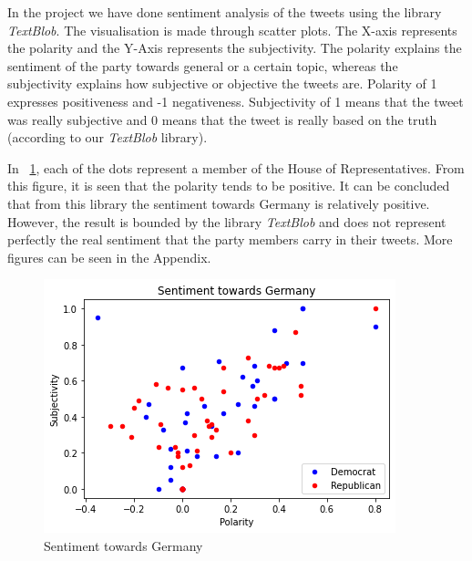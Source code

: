In the project we have done sentiment analysis of the tweets using the library \textit{TextBlob}. The visualisation is made through scatter plots. The X-axis represents the polarity and the Y-Axis represents the subjectivity. The polarity explains the sentiment of the party towards general or a certain topic, whereas the subjectivity explains how subjective or objective the tweets are. Polarity of 1 expresses positiveness and -1 negativeness. Subjectivity of 1 means that the tweet was really subjective and 0 means that the tweet is really based on the truth (according to our \textit{TextBlob} library).

In ~\ref{fig:boat3}, each of the dots represent a member of the House of Representatives. From this figure, it is seen that the polarity tends to be positive. It can be concluded that from this library the sentiment towards Germany is relatively positive. However, the result is bounded by the library \textit{TextBlob} and does not represent perfectly the real sentiment that the party members carry in their tweets. More figures can be seen in the Appendix.

\begin{figure}
  \centering
  \includegraphics[width=0.7\linewidth]{images/Kapitel3/Sentiment_Germany.png}
	\caption{\label{fig:boat3}Sentiment towards Germany}{}
\end{figure}
